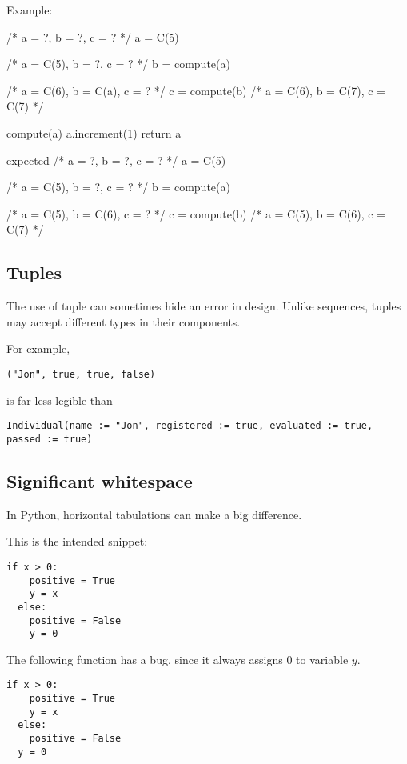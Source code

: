 Example:

/* a = ?, b = ?, c = ? */
a = C(5)

/* a = C(5), b = ?, c = ? */
b = compute(a)

/* a = C(6), b = C(a), c = ? */
c = compute(b)
/* a = C(6), b = C(7), c = C(7) */


compute(a)
a.increment(1)
return a


expected
/* a = ?, b = ?, c = ? */
a = C(5)

/* a = C(5), b = ?, c = ? */
b = compute(a)

/* a = C(5), b = C(6), c = ? */
c = compute(b)
/* a = C(5), b = C(6), c = C(7) */

\subsection{Tuples}

The use of tuple can sometimes hide an error in design.
Unlike sequences, tuples may accept different types in their components.

For example,

\begin{lstlisting}[label={lst:exampleJonTuple}]
  ("Jon", true, true, false)
\end{lstlisting}

is far less legible than

\begin{lstlisting}[label={lst:exampleJonIndividual}]
  Individual(name := "Jon", registered := true, evaluated := true, passed := true)
\end{lstlisting}

\subsection{Significant whitespace}

In Python, horizontal tabulations can make a big difference.

This is the intended snippet:

\begin{lstlisting}[label={lst:snippetInPython1}]
  if x > 0:
    positive = True
    y = x
  else:
    positive = False
    y = 0
\end{lstlisting}


The following function has a bug, since it always assigns 0 to variable $y$.

\begin{lstlisting}[label={lst:snippetInPython2}]
  if x > 0:
    positive = True
    y = x
  else:
    positive = False
  y = 0
\end{lstlisting}

